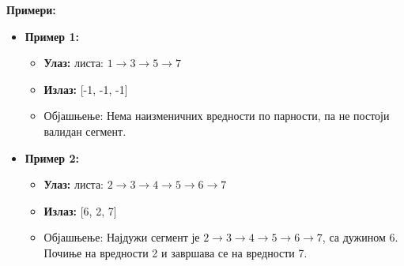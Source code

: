 \textbf{Примери:}
\begin{itemize}
    \item \textbf{Пример 1:}
    \begin{itemize}
        \item \textbf{Улаз:} листа: $1 \rightarrow 3 \rightarrow 5 \rightarrow 7$
        \item \textbf{Излаз:} [-1, -1, -1]
        \item Објашњење: Нема наизменичних вредности по парности, па не постоји валидан сегмент.
    \end{itemize}
    \item \textbf{Пример 2:}
    \begin{itemize}
        \item \textbf{Улаз:} листа: $2 \rightarrow 3 \rightarrow 4 \rightarrow 5 \rightarrow 6 \rightarrow 7$
        \item \textbf{Излаз:} [6, 2, 7]
        \item Објашњење: Најдужи сегмент је $2 \rightarrow 3 \rightarrow 4 \rightarrow 5 \rightarrow 6 \rightarrow 7$, са дужином 6. Почиње на вредности 2 и завршава се на вредности 7.
    \end{itemize}
\end{itemize}


